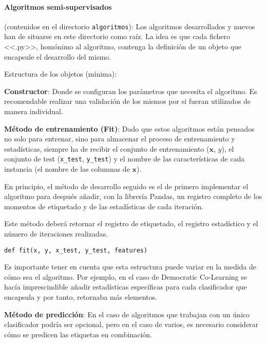 \paragraph{Algoritmos semi-supervisados} (contenidos en el directorio
\texttt{algoritmos}): Los algoritmos desarrollados y nuevos han de situarse en
este directorio como raíz. La idea es que cada fichero <<.py>>, homónimo al
algoritmo, contenga la definición de un objeto que encapsule el desarrollo del
mismo.

Estructura de los objetos (mínima):

\textbf{Constructor}: Donde se configuran los parámetros que necesita el
algoritmo. Es recomendable realizar una validación de los mismos por si fueran
utilizados de manera individual.

\textbf{Método de entrenamiento (Fit)}: Dado que estos algoritmos están pensados
no solo para entrenar, sino para almacenar el proceso de entrenamiento y
estadísticas, siempre ha de recibir el conjunto de entrenamiento ($\mathbf{x}$,
$y$), el conjunto de test (\texttt{x\_test}, \texttt{y\_test}) y el nombre de
las características de cada instancia (el nombre de las columnas de
$\mathbf{x}$).

En principio, el método de desarrollo seguido es el de primero implementar el
algoritmo para después añadir, con la librería Pandas, un registro completo de
los momentos de etiquetado y de las estadísticas de cada iteración.

Este método deberá retornar el registro de etiquetado, el registro estadístico y el
número de iteraciones realizadas.

\begin{tcolorbox}[colback=cyan!5!white,colframe=cyan!75!black,title=Cabecera fit]
\begin{verbatim}
def fit(x, y, x_test, y_test, features)
\end{verbatim}
\end{tcolorbox}

Es importante tener en cuenta que esta estructura puede variar en la medida de
cómo sea el algoritmo. Por ejemplo, en el caso de Democratic Co-Learning se
hacía imprescindible añadir estadísticas específicas para cada clasificador que
encapsula y por tanto, retornaba más elementos.

\textbf{Método de predicción}: En el caso de algoritmos que trabajan con un único
clasificador podría ser opcional, pero en el caso de varios, es necesario
considerar cómo se predicen las etiquetas en combinación.

